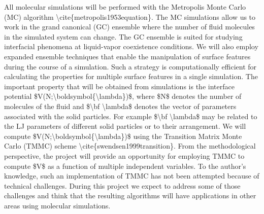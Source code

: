 \par All molecular simulations will be performed with the Metropolis Monte Carlo (MC) algorithm \textbackslash cite\{metropolis1953equation\}. The MC simulations allow us to work in the grand canonical (GC) ensemble where the number of fluid molecules in the simulated system can change. The GC ensemble is suited for studying interfacial phenomena at liquid-vapor coexistence conditions. We will also employ expanded ensemble techniques that  enable the manipulation of surface features during the course of a simulation. Such a strategy is computationally efficient for calculating the properties for multiple surface features in a single simulation. The important property that will be obtained from simulations is the interface potential \$V(N;\textbackslash boldsymbol\{\textbackslash lambda\})\$, where \$N\$ denotes the number of molecules of the fluid and \$\textbackslash bf \textbackslash lambda\$ denotes the vector of parameters associated with the solid particles. For example \$\textbackslash bf \textbackslash lambda\$ may be related to the LJ parameters of different solid particles or to their arrangement. We will compute \$V(N;\textbackslash boldsymbol\{\textbackslash lambda\})\$ using the Transition Matrix Monte Carlo (TMMC) scheme \textbackslash cite\{swendsen1999transition\}. From the methodological perspective, the project will provide an opportunity for employing TMMC to compute \$V\$ as a function of multiple independent variables. To the author's knowledge, such an implementation of TMMC has not been attempted because of technical challenges. During this project we expect to address some of those challenges and think that the resulting algorithms will have applications in other areas using molecular simulations.
